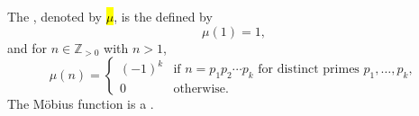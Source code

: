 \begin{definition} \label{definition:mobius_function_on_positive_integers}
The , denoted by \hl{$\mu$}, is the  defined by
$$\mu(1) = 1,$$
and for $n \in \mathbb{Z}_{>0}$ with $n > 1$,
$$\mu(n) = \begin{cases} (-1)^k & \text{if } n = p_1 p_2 \cdots p_k \text{ for distinct primes } p_1, \dots, p_k, \\ 0 & \text{otherwise.} \end{cases}$$
The Möbius function is a .
\end{definition}
